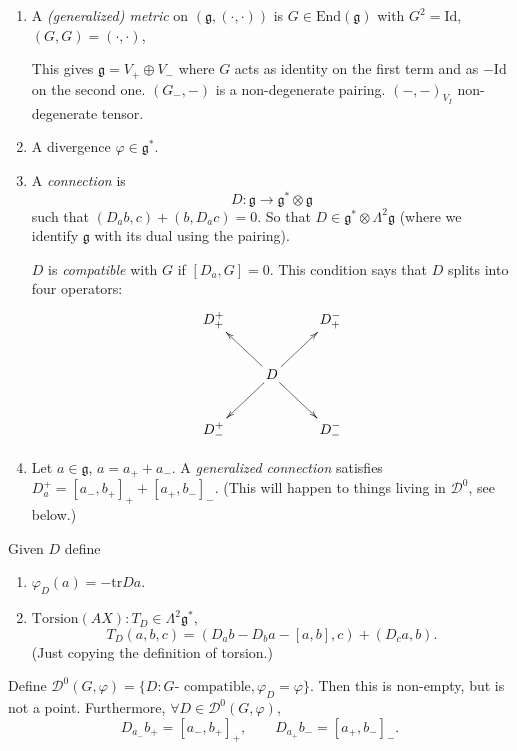 \medskip\noindent
\begin{definition}
\label{definition-generalizaed}
\begin{enumerate}
\item A {\it (generalized) metric} on
$(\mathfrak{g},(\cdot,\cdot))$ is
$G \in \text{End}(\mathfrak{g})$ with
$G^2=\text{Id}$, $(G,G)=(\cdot,\cdot)$,

This gives $\mathfrak{g}=V_+ \oplus V_-$
where $G$ acts as identity on the
first term and as $-\text{Id}$ on the second
one.
$(G_-,-)$ is a non-degenerate pairing.
$(-,-)_{V_I}$ non-degenerate tensor.

\item A divergence $\varphi \in \mathfrak{g}
^*$.

\item A {\it connection} is
$$
D: \mathfrak{g} \to \mathfrak{g}^* \otimes
\mathfrak{g}
$$
such that $(D_ab,c)+(b,D_ac)=0$.
So that $D \in \mathfrak{g}^*  \otimes
\Lambda^{2}\mathfrak{g}$
(where we identify $\mathfrak{g}$ with its
dual using the pairing).

$D$ is  {\it compatible} with $G$ if
$[D_a,G]=0$. This condition says that $D$
splits into four operators:
$$
\xymatrix{
D^+_+&  &  D_+^-\\
&  D\ar[ul]\ar[ur]\ar[dl]\ar[dr]\\
D^+_-& & D_-^-
}
$$
\item  Let $a \in \mathfrak{g}$, $a=a_++a_-$.
A {\it generalized connection} satisfies
$D_a^+=[a_-,b_+]_+ +[a_+,b_-]_-$. (This will
happen to things
living in $\mathcal{D}^0$, see below.)
\end{enumerate}
\end{definition}

\begin{definition}
\label{definition-}
Given $D$ define
\begin{enumerate}
\item $\varphi_D(a)=-\text{tr}Da$.
\item $\text{Torsion}(AX):T_D \in
\Lambda^{2}\mathfrak{g}^*$,
$$
T_D(a,b,c)=(D_ab-D_ba-[a,b],c)+(D_ca,b).
$$
(Just copying the definition of torsion.)
\end{enumerate}
\end{definition}

\begin{lemma}
\label{lemma-}
Define
$\mathcal{D}^0(G,\varphi)=\{D:G\text{-
compatible
}, \varphi_D=\varphi\}$.
Then this is non-empty, but is not a point.
Furthermore, $\forall  D \in
\mathcal{D}^0(G,\varphi)$,
$$
D_{a_-}b_+=[a_-,b_+]_+,\qquad
D_{a_+}b_-=[a_+,b_-]_-.
$$
\end{lemma}


